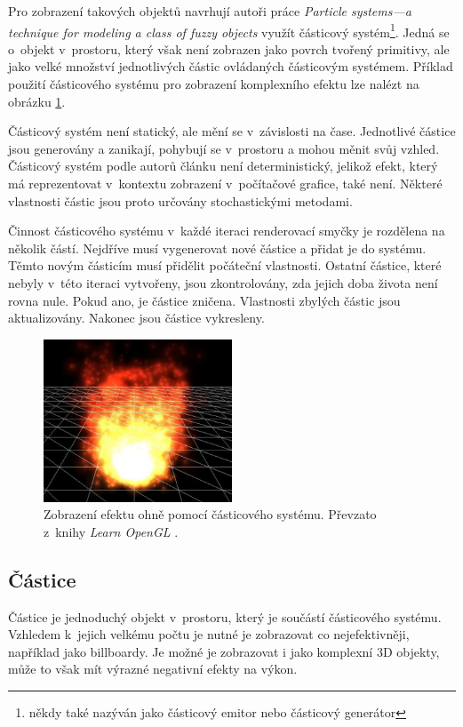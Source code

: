 Pro zobrazení takových objektů navrhují autoři práce \emph{Particle systems—a technique for modeling a class of fuzzy objects} \cite{reeves1983particle} využít částicový systém\footnote{někdy také nazýván jako částicový emitor nebo částicový generátor}. Jedná se o~objekt v~prostoru, který však není zobrazen jako povrch tvořený primitivy, ale jako velké množství jednotlivých částic ovládaných částicovým systémem. Příklad použití částicového systému pro zobrazení komplexního efektu lze nalézt na obrázku \ref{fig:particles_expample}.

Částicový systém není statický, ale mění se v~závislosti na čase. Jednotlivé částice jsou generovány a zanikají, pohybují se v~prostoru a mohou měnit svůj vzhled. Částicový systém  podle autorů článku není deterministický, jelikož efekt, který má reprezentovat v~kontextu zobrazení v~počítačové grafice, také není. Některé vlastnosti částic jsou proto určovány stochastickými metodami. 

Činnost částicového systému v~každé iteraci renderovací smyčky je rozdělena na několik částí. Nejdříve musí vygenerovat nové částice a přidat je do systému. Těmto novým částicím musí přidělit počáteční vlastnosti. Ostatní částice, které nebyly v~této iteraci vytvořeny, jsou zkontrolovány, zda jejich doba života není rovna nule. Pokud ano, je částice zničena. Vlastnosti zbylých částic jsou aktualizovány. Nakonec jsou částice vykresleny. 
\begin{figure}[H]
	\centering
	\includegraphics[width=0.5\textwidth]{obrazky-figures/test7.png}
	\caption{Zobrazení efektu ohně pomocí částicového systému. Převzato z~knihy \emph{Learn OpenGL} \cite[kapitola 56]{de2020learn}. }
	\label{fig:particles_expample}
\end{figure}

\subsection{Částice}
Částice je jednoduchý objekt v~prostoru, který je součástí částicového systému. Vzhledem k~jejich velkému počtu je nutné je zobrazovat co nejefektivněji, například jako billboardy. Je možné je zobrazovat i jako komplexní 3D objekty, může to však mít výrazné negativní efekty na výkon. 

